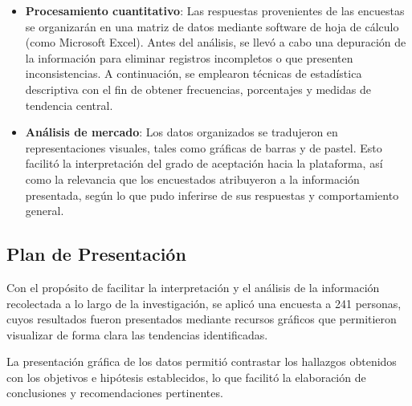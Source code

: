 \begin{itemize}
    \item \textbf{Procesamiento cuantitativo}: Las respuestas provenientes de las encuestas se
          organizarán en una matriz de datos mediante software de hoja de cálculo (como
          Microsoft Excel). Antes del análisis, se llevó a cabo una depuración de la
          información para eliminar registros incompletos o que presenten inconsistencias.
          A continuación, se emplearon técnicas de estadística descriptiva con el fin de
          obtener frecuencias, porcentajes y medidas de tendencia central. 
          
    \item \textbf{Análisis de mercado}: Los datos organizados se tradujeron en representaciones
          visuales, tales como gráficas de barras y de pastel. Esto facilitó la
          interpretación del grado de aceptación hacia la plataforma, así como la
          relevancia que los encuestados atribuyeron a la información presentada, según lo
          que pudo inferirse de sus respuestas y comportamiento general. 
\end{itemize}

\subsection{Plan de Presentación}

Con el propósito de facilitar la interpretación y el análisis de la información
recolectada a lo largo de la investigación, se aplicó una encuesta a 241
personas, cuyos resultados fueron presentados mediante recursos
gráficos que permitieron visualizar de forma clara las tendencias identificadas. 

La presentación gráfica de los datos permitió contrastar los hallazgos
obtenidos con los objetivos e hipótesis establecidos, lo que facilitó la
elaboración de conclusiones y recomendaciones pertinentes.